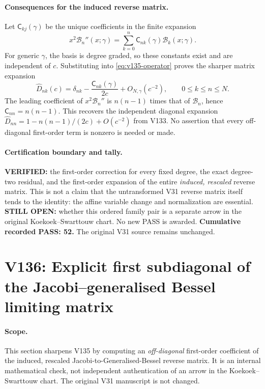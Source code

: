 \documentclass[11pt]{article}
\begin{document}
\paragraph{Consequences for the induced reverse matrix.}
Let $\mathsf C_{kj}(\gamma)$ be the unique coefficients in the finite
expansion
\begin{equation}\label{eq:v135-C}
 x^2\mathcal B_n''(x;\gamma)
 =\sum_{k=0}^n \mathsf C_{nk}(\gamma)\mathcal B_k(x;\gamma).
\end{equation}
For generic $\gamma$, the basis is degree graded, so these constants
exist and are independent of $c$.  Substituting into
\eqref{eq:v135-operator} proves the sharper matrix expansion
\begin{equation}\label{eq:v135-matrix}
 \boxed{\widehat D_{nk}(c)
 =\delta_{nk}-\frac{\mathsf C_{nk}(\gamma)}{2c}
 +O_{N,\gamma}(c^{-2}),\qquad 0\le k\le n\le N.}
\end{equation}
The leading coefficient of $x^2\mathcal B_n''$ is $n(n-1)$ times
that of $\mathcal B_n$, hence $\mathsf C_{nn}=n(n-1)$.
This recovers the independent diagonal expansion
$\widehat D_{nn}=1-n(n-1)/(2c)+O(c^{-2})$ from V133.
No assertion that every off-diagonal first-order term is nonzero is
needed or made.

\paragraph{Certification boundary and tally.}
\textbf{VERIFIED:} the first-order correction for every fixed degree,
the exact degree-two residual, and the first-order expansion of the
entire \emph{induced, rescaled} reverse matrix.  This is not a claim
that the untransformed V31 reverse matrix itself tends to the identity:
the affine variable change and normalization are essential.
\textbf{STILL OPEN:} whether this ordered family pair is a separate
arrow in the original Koekoek--Swarttouw chart.  No new PASS is awarded.
\textbf{Cumulative recorded PASS: 52.} The original V31 source remains
unchanged.


\clearpage
\section{V136: Explicit first subdiagonal of the Jacobi--generalised Bessel limiting matrix}
\label{sec:v136-first-subdiagonal}
\paragraph{Scope.}
This section sharpens V135 by computing an \emph{off-diagonal} first-order
coefficient of the induced, rescaled Jacobi-to-Generalised-Bessel reverse
matrix. It is an internal mathematical check, not independent authentication
of an arrow in the Koekoek--Swarttouw chart. The original V31 manuscript is
not changed.
\end{document}
